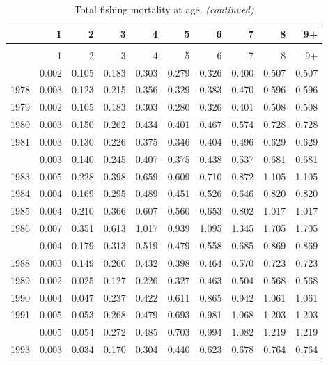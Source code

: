 \documentclass[
]{article}
\begin{document}
\begin{longtable}[t]{lrrrrrrrrr}
\caption{\label{tab:FAA-tot-table}Total fishing mortality at age.}\\
\toprule
  & 1 & 2 & 3 & 4 & 5 & 6 & 7 & 8 & 9+\\
\midrule
\endfirsthead
\caption[]{Total fishing mortality at age. \textit{(continued)}}\\
\toprule
  & 1 & 2 & 3 & 4 & 5 & 6 & 7 & 8 & 9+\\
\midrule
\endhead

\endfoot
\bottomrule
\endlastfoot
1977 & 0.002 & 0.105 & 0.183 & 0.303 & 0.279 & 0.326 & 0.400 & 0.507 & 0.507\\
1978 & 0.003 & 0.123 & 0.215 & 0.356 & 0.329 & 0.383 & 0.470 & 0.596 & 0.596\\
1979 & 0.002 & 0.105 & 0.183 & 0.303 & 0.280 & 0.326 & 0.401 & 0.508 & 0.508\\
1980 & 0.003 & 0.150 & 0.262 & 0.434 & 0.401 & 0.467 & 0.574 & 0.728 & 0.728\\
1981 & 0.003 & 0.130 & 0.226 & 0.375 & 0.346 & 0.404 & 0.496 & 0.629 & 0.629\\
\addlinespace
1982 & 0.003 & 0.140 & 0.245 & 0.407 & 0.375 & 0.438 & 0.537 & 0.681 & 0.681\\
1983 & 0.005 & 0.228 & 0.398 & 0.659 & 0.609 & 0.710 & 0.872 & 1.105 & 1.105\\
1984 & 0.004 & 0.169 & 0.295 & 0.489 & 0.451 & 0.526 & 0.646 & 0.820 & 0.820\\
1985 & 0.004 & 0.210 & 0.366 & 0.607 & 0.560 & 0.653 & 0.802 & 1.017 & 1.017\\
1986 & 0.007 & 0.351 & 0.613 & 1.017 & 0.939 & 1.095 & 1.345 & 1.705 & 1.705\\
\addlinespace
1987 & 0.004 & 0.179 & 0.313 & 0.519 & 0.479 & 0.558 & 0.685 & 0.869 & 0.869\\
1988 & 0.003 & 0.149 & 0.260 & 0.432 & 0.398 & 0.464 & 0.570 & 0.723 & 0.723\\
1989 & 0.002 & 0.025 & 0.127 & 0.226 & 0.327 & 0.463 & 0.504 & 0.568 & 0.568\\
1990 & 0.004 & 0.047 & 0.237 & 0.422 & 0.611 & 0.865 & 0.942 & 1.061 & 1.061\\
1991 & 0.005 & 0.053 & 0.268 & 0.479 & 0.693 & 0.981 & 1.068 & 1.203 & 1.203\\
\addlinespace
1992 & 0.005 & 0.054 & 0.272 & 0.485 & 0.703 & 0.994 & 1.082 & 1.219 & 1.219\\
1993 & 0.003 & 0.034 & 0.170 & 0.304 & 0.440 & 0.623 & 0.678 & 0.764 & 0.764\\

\end{longtable}
\end{document}
